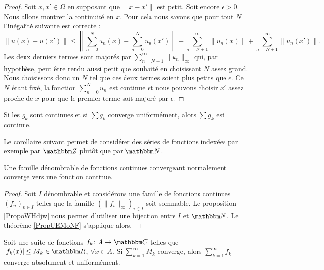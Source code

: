 \begin{proof}
    Soit \( x,x'\in \Omega\) en supposant que \( \| x-x' \|\) est petit. Soit encore \( \epsilon>0\). Nous allons montrer la continuité en \( x\). Pour cela nous savons que pour tout \( N\) l'inégalité suivante est correcte :
    \begin{equation}
        \| u(x)-u(x') \|\leq \left\|  \sum_{n=0}^Nu_n(x)-\sum_{n=0}^{N}u_n(x') \right\|+\sum_{n=N+1}^{\infty}\| u_n(x) \|+\sum_{n=N+1}^{\infty}\| u_n(x') \|.
    \end{equation}
    Les deux derniers termes sont majorés par \( \sum_{n=N+1}^{\infty}\| u_n \|_{\infty}\) qui, par hypothèse, peut être rendu aussi petit que souhaité en choisissant \( N\) assez grand. Nous choisissons donc un \( N\) tel que ces deux termes soient plus petits que \( \epsilon\). Ce \( N\) étant fixé, la fonction \( \sum_{n=0}^{N}u_n\) est continue et nous pouvons choisir \( x'\) assez proche de \( x\) pour que le premier terme soit majoré par \( \epsilon\).
\end{proof}

\begin{theorem}			\label{ThoSerUnifCont}
	Si les $g_k$ sont continues et si $\sum g_k$ converge uniformément, alors $\sum g_k$ est continue.
\end{theorem}

Le corollaire suivant permet de considérer des séries de fonctions indexées par exemple par \( \eZ\) plutôt que par \( \eN\).
\begin{corollary}
    Une famille dénombrable de fonctions continues convergeant normalement converge vers une fonction continue.
\end{corollary}

\begin{proof}
    Soit \( I\) dénombrable et considérons une famille de fonctions continues \( (f_n)_{n\in I}\) telles que la famille \( (\| f_i \|_{\infty})_{i\in I}\) soit sommable. Le proposition \ref{PropoWHdjw} nous permet d'utiliser une bijection entre \( I\) et \( \eN\). Le théorème \ref{PropUEMoNF} s'applique alors.
\end{proof}

\begin{theorem}		\label{ThoCritWeierstrass}
	Soit une suite de fonctions $f_k\colon A\to \eC$ telles que $| f_k(x) |\leq M_k\in\eR$, $\forall x\in A$. Si $\sum_{k=1}^{\infty}M_k$ converge, alors $\sum_{k=1}^{\infty}f_k$ converge absolument et uniformément.
\end{theorem}

